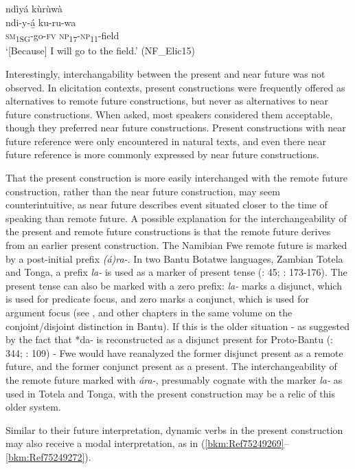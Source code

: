 \ea
\label{bkm:Ref494976898}
ndìyá kùrùwà\\
\gll ndi-y-á̲  ku-ru-wa\\
\textsc{sm}\textsubscript{1SG}-go-\textsc{fv}  \textsc{np}\textsubscript{17}-\textsc{np}\textsubscript{11}-field\\
\glt ‘[Because] I will go to the field.’ (NF\_Elic15)
\z

Interestingly, interchangability between the present and near future was not observed. In elicitation contexts, present constructions were frequently offered as alternatives to remote future constructions, but never as alternatives to near future constructions. When asked, most speakers considered them acceptable, though they preferred near future constructions. Present constructions with near future reference were only encountered in natural texts, and even there near future reference is more commonly expressed by near future constructions.

That the present construction is more easily interchanged with the remote future construction, rather than the near future construction, may seem counterintuitive, as near future describes event situated closer to the time of speaking than remote future. A possible explanation for the interchangeability of the present and remote future constructions is that the remote future derives from an earlier present construction. The Namibian Fwe remote future is marked by a post-initial prefix \textit{(á)ra-}. In two Bantu Botatwe languages, Zambian Totela and Tonga, a prefix \textit{la-} is used as a marker of present tense (\citealt{Carter2002}: 45; \citealt{Crane2011}: 173-176). The present tense can also be marked with a zero prefix: \textit{la-} marks a disjunct, which is used for predicate focus, and zero marks a conjunct, which is used for argument focus (see {\citet{WalHyman2017}}, and other chapters in the same volume on the conjoint/disjoint distinction in Bantu). If this is the older situation - as suggested by the fact that *da- is reconstructed as a disjunct present for Proto-Bantu (\citealt{Güldemann2003}: 344; \citealt{Meeussen1967}: 109) - Fwe would have reanalyzed the former disjunct present as a remote future, and the former conjunct present as a present. The interchangeability of the remote future marked with \textit{ára-}, presumably cognate with the marker \textit{la-} as used in Totela and Tonga, with the present construction may be a relic of this older system.

Similar to their future interpretation, dynamic verbs in the present construction may also receive a modal interpretation, as in (\ref{bkm:Ref75249269}--\ref{bkm:Ref75249272}).


